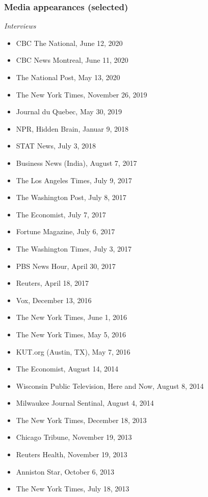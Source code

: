 \documentclass[
  letterpaper,
  DIV=11,
  numbers=noendperiod]{scrartcl}
\providecommand{\tightlist}{%
  \setlength{\itemsep}{0pt}\setlength{\parskip}{0pt}}
\begin{document}
\subsubsection{Media appearances
(selected)}\label{media-appearances-selected}

\emph{Interviews}

\begin{itemize}
\tightlist
\item
  CBC The National, June 12, 2020
\item
  CBC News Montreal, June 11, 2020
\item
  The National Post, May 13, 2020
\item
  The New York Times, November 26, 2019
\item
  Journal du Quebec, May 30, 2019
\item
  NPR, Hidden Brain, Januar 9, 2018
\item
  STAT News, July 3, 2018
\item
  Business News (India), August 7, 2017
\item
  The Los Angeles Times, July 9, 2017
\item
  The Washington Post, July 8, 2017
\item
  The Economist, July 7, 2017
\item
  Fortune Magazine, July 6, 2017
\item
  The Washington Times, July 3, 2017
\item
  PBS News Hour, April 30, 2017
\item
  Reuters, April 18, 2017
\item
  Vox, December 13, 2016
\item
  The New York Times, June 1, 2016
\item
  The New York Times, May 5, 2016
\item
  KUT.org (Austin, TX), May 7, 2016
\item
  The Economist, August 14, 2014
\item
  Wisconsin Public Television, Here and Now, August 8, 2014
\item
  Milwaukee Journal Sentinal, August 4, 2014
\item
  The New York Times, December 18, 2013
\item
  Chicago Tribune, November 19, 2013
\item
  Reuters Health, November 19, 2013
\item
  Anniston Star, October 6, 2013
\item
  The New York Times, July 18, 2013

\end{itemize}
\end{document}
